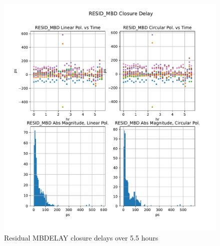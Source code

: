 \documentclass[letterpaper,twoside,12pt]{article}
\begin{document}
\begin{figure}[ht!]
  \begin{center}
  \includegraphics[width=40pc]{RESID_MBD_Closure_Delay.pdf}
  \caption{\small Residual MBDELAY closure delays over 5.5 hours }
  \label{resid_mbd}
  \end{center}
\end{figure}
\end{document}

